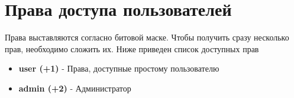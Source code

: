 \section{Права доступа пользователей}
\par
Права выставляются согласно битовой маске. Чтобы получить сразу несколько прав, необходимо сложить их.
Ниже приведен список доступных прав

\begin{itemize}
  \item \textbf{user (+1)} - Права, доступные простому пользователю
  \item \textbf{admin (+2)} - Администратор
\end{itemize}
